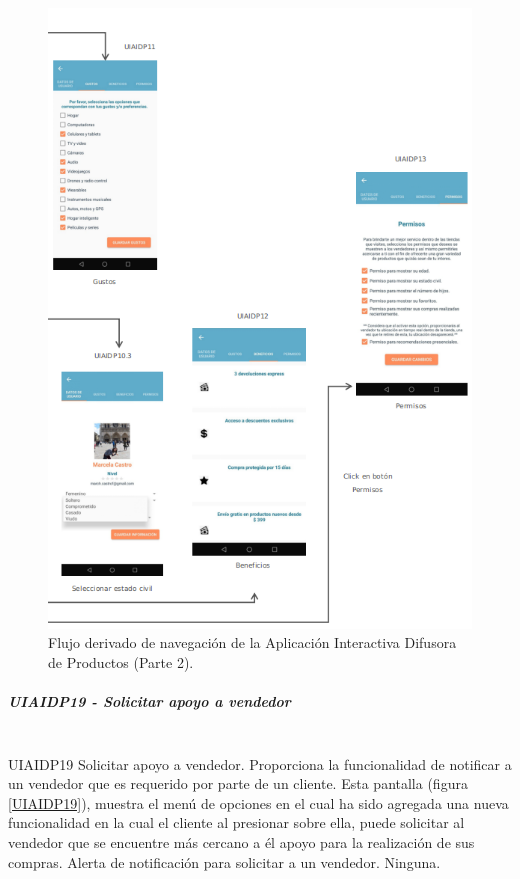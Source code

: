 \FloatBarrier
\begin{figure}[htbp!]
		\centering
			\includegraphics[width=.75 \textwidth]{imagenes/mapaNav2NuevoP2}
		\caption{Flujo derivado de navegación de la Aplicación Interactiva Difusora de Productos (Parte 2).}
		\label{image:map6}
\end{figure}
\FloatBarrier
 
\subparagraph{UIAIDP19 - Solicitar apoyo a vendedor} ~\\
\FloatBarrier
{} %
{UIAIDP19} %
{Solicitar apoyo a vendedor.}  %
{Proporciona la funcionalidad de notificar a un vendedor que es requerido por parte de un cliente.} %
{Esta pantalla (figura \ref{UIAIDP19}), muestra el menú de opciones en el cual ha sido agregada una nueva funcionalidad en la cual el cliente al presionar sobre ella, puede solicitar al vendedor que se encuentre más cercano a él apoyo para la realización de sus compras.} %
{Alerta de notificación para solicitar a un vendedor.} %
{Ninguna.} %
\FloatBarrier

